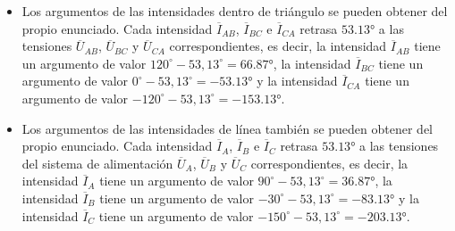 \begin{itemize}
\[  \]
\item Los argumentos de las intensidades dentro de triángulo se pueden
  obtener del propio enunciado. Cada intensidad $\overline{I}_{AB}$,
  $\overline{I}_{BC}$ e $\overline{I}_{CA}$ retrasa
  $\ang{53,13}$ a las tensiones $\overline{U}_{AB}$,
  $\overline{U}_{BC}$ y $\overline{U}_{CA}$ correspondientes, es
  decir, la intensidad $\overline{I}_{AB}$ tiene un argumento de valor
  $120^\circ-53,13^\circ=\ang{66,87}$, la intensidad $\overline{I}_{BC}$
  tiene un argumento de valor $0^\circ-53,13^\circ=\ang{-53,13}$ y la
  intensidad $\overline{I}_{CA}$ tiene un argumento de valor
  $-120^\circ-53,13^\circ=\ang{-153,13}$.
\item Los argumentos de las intensidades de línea también se pueden
  obtener del propio enunciado. Cada intensidad $\overline{I}_A$,
  $\overline{I}_B$ e $\overline{I}_C$ retrasa $\ang{53,13}$ a
  las tensiones del sistema de alimentación $\overline{U}_A$,
  $\overline{U}_B$ y $\overline{U}_C$ correspondientes, es decir, la
  intensidad $\overline{I}_A$ tiene un argumento de valor
  $90^\circ-53,13^\circ=\ang{36,87}$, la intensidad $\overline{I}_B$ tiene
  un argumento de valor $-30^\circ-53,13^\circ=\ang{-83,13}$ y la
  intensidad $\overline{I}_C$ tiene un argumento de valor
  $-150^\circ-53,13^\circ=\ang{-203,13}$.
\end{itemize}

